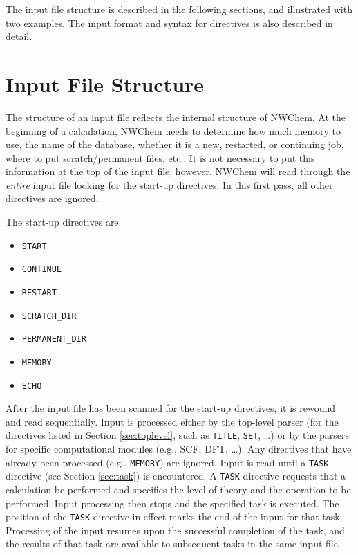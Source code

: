 The input file structure is described in the following sections, and
illustrated with two examples.  The input format and syntax for directives
is also described in detail.

\section{Input File Structure}
\label{sec:inputstructure}

The structure of an input file reflects the internal structure of
NWChem.  At the beginning of a calculation, NWChem needs to determine
how much memory to use, the name of the database, whether it is a new,
restarted, or continuing job, where to put scratch/permanent files,
etc..  It is not necessary to put this information at the top of the
input file, however.  NWChem will read through the {\em entire} input
file looking for the start-up directives.  In this first pass, all other
directives are ignored.

The start-up directives are
\begin{itemize}
\item \verb+START+
\item \verb+CONTINUE+
\item \verb+RESTART+
\item \verb+SCRATCH_DIR+
\item \verb+PERMANENT_DIR+
\item \verb=MEMORY=
\item \verb=ECHO=
\end{itemize}

After the input file has been scanned for the start-up directives, it
is rewound and read sequentially.  Input is processed either by the
top-level parser (for the directives listed in Section
\ref{sec:toplevel}, such as \verb+TITLE+, \verb+SET+, \ldots) or by
the parsers for specific computational modules (e.g., SCF, DFT,
\ldots).  Any directives that have already been processed (e.g.,
\verb+MEMORY+) are ignored.  Input is read until a \verb+TASK+
directive (see Section \ref{sec:task}) is encountered.  A \verb+TASK+
directive requests that a calculation be performed and specifies the level
of theory and the operation to be performed.  Input processing then
stops and the specified task is executed.  The position of the
\verb+TASK+ directive in effect marks the end of the input for that
task.  Processing of the input resumes upon the successful completion
of the task, and the results of that task are available to subsequent
tasks in the same input file.

